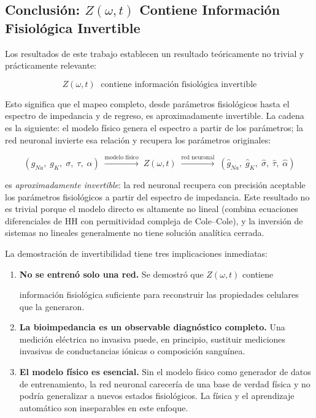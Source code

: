 \documentclass[12pt]{article}
\begin{document}
\subsection{Conclusi\'on: $Z(\omega,t)$ Contiene Informaci\'on Fisiol\'ogica Invertible}

Los resultados de este trabajo establecen un resultado te\'oricamente no trivial y
pr\'acticamente relevante:

\begin{equation}
\boxed{
Z(\omega,t) \;\text{ contiene informaci\'on fisiol\'ogica invertible}
}
\end{equation}

Esto significa que el mapeo completo, desde par\'ametros fisiol\'ogicos hasta
el espectro de impedancia y de regreso, es aproximadamente invertible. La cadena
es la siguiente: el modelo f\'isico genera el espectro a partir de los par\'ametros;
la red neuronal invierte esa relaci\'on y recupera los par\'ametros originales:

\begin{equation}
(g_{Na},\;g_K,\;\sigma,\;\tau,\;\alpha)
\;\xrightarrow{\text{modelo f\'isico}}\;
Z(\omega,t)
\;\xrightarrow{\text{red neuronal}}\;
(\hat{g}_{Na},\;\hat{g}_K,\;\hat{\sigma},\;\hat{\tau},\;\hat{\alpha})
\end{equation}

es \emph{aproximadamente invertible}: la red neuronal recupera con precisi\'on aceptable los
par\'ametros fisiol\'ogicos a partir del espectro de impedancia. Este resultado no es trivial
porque el modelo directo es altamente no lineal (combina ecuaciones diferenciales de HH con
permitividad compleja de Cole--Cole), y la inversi\'on de sistemas no lineales generalmente
no tiene soluci\'on anal\'itica cerrada.

La demostraci\'on de invertibilidad tiene tres implicaciones inmediatas:

\begin{enumerate}
\item \textbf{No se entren\'o solo una red.} Se demostr\'o que $Z(\omega,t)$ contiene

informaci\'on fisiol\'ogica suficiente para reconstruir las propiedades celulares que la
generaron.
\item \textbf{La bioimpedancia es un observable diagn\'ostico completo.} Una medici\'on
el\'ectrica no invasiva puede, en principio, sustituir mediciones invasivas de conductancias
i\'onicas o composici\'on sangu\'inea.
\item \textbf{El modelo f\'isico es esencial.} Sin el modelo f\'isico como generador de
datos de entrenamiento, la red neuronal carecer\'ia de una base de verdad f\'isica y no
podr\'ia generalizar a nuevos estados fisiol\'ogicos. La f\'isica y el aprendizaje autom\'atico
son inseparables en este enfoque.
\end{enumerate}
\end{document}
